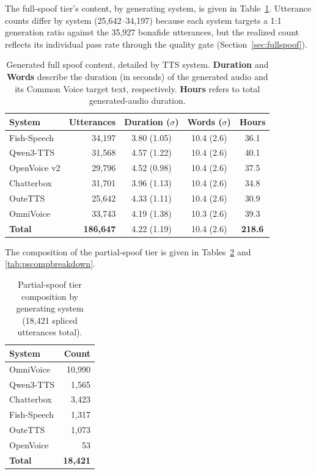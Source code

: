\documentclass[11pt]{report}
\begin{document}
The full-spoof tier's content, by generating system, is given in
Table~\ref{tab:fullspoofdesc}. Utterance counts differ by system
(25{,}642--34{,}197) because each system targets a 1:1 generation ratio
against the 35{,}927 bonafide utterances, but the realized count
reflects its individual pass rate through the quality gate
(Section~\ref{sec:fullspoof}).

\begin{table}[H]
\centering
\caption{Generated full spoof content, detailed by
TTS system. \textbf{Duration} and \textbf{Words} describe the
duration (in seconds) of the generated audio and its Common Voice target text, respectively. \textbf{Hours} refers to total generated-audio duration.}
\label{tab:fullspoofdesc}
\small
\begin{tabular}{lrccc}
\toprule
\textbf{System} & \textbf{Utterances} & \textbf{Duration ($\sigma$)}  & \textbf{Words ($\sigma$)} & \textbf{Hours} \\
\midrule
Fish-Speech & 34{,}197 & 3.80 (1.05) & 10.4 (2.6) & 36.1 \\
Qwen3-TTS              & 31{,}568 & 4.57 (1.22) & 10.4 (2.6) & 40.1 \\
OpenVoice v2           & 29{,}796 & 4.52 (0.98) & 10.4 (2.6) & 37.5 \\
Chatterbox             & 31{,}701 & 3.96 (1.13) & 10.4 (2.6) & 34.8 \\
OuteTTS                & 25{,}642 & 4.33 (1.11) & 10.4 (2.6) & 30.9 \\
OmniVoice              & 33{,}743 & 4.19 (1.38) & 10.3 (2.6) & 39.3 \\
\midrule
\textbf{Total}         & \textbf{186{,}647} & 4.22 (1.19) & 10.4 (2.6) & \textbf{218.6} \\
\bottomrule
\end{tabular}
\end{table}

The composition of the partial-spoof tier is given in
Tables~\ref{tab:pscompsystem} and \ref{tab:pscompbreakdown}.

\begin{table}[H]
\centering
\caption{Partial-spoof tier composition by generating system
(18{,}421 spliced utterances total).}
\label{tab:pscompsystem}
\small
\begin{tabular}{lr}
\toprule
\textbf{System} & \textbf{Count} \\
\midrule
OmniVoice   & 10{,}990 \\
Qwen3-TTS   &  1{,}565 \\
Chatterbox  &  3{,}423 \\
Fish-Speech &  1{,}317 \\
OuteTTS     &  1{,}073 \\
OpenVoice   &     53   \\
\midrule
\textbf{Total} & \textbf{18{,}421} \\
\bottomrule
\end{tabular}
\end{table}
\end{document}
